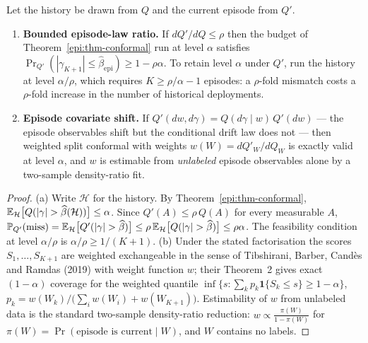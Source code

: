 \begin{theorem}\label{epi:thm-shift}
Let the history be drawn from $Q$ and the current episode from $Q'$.
\begin{enumerate}
\item[\textnormal{(a)}] \textbf{Bounded episode-law ratio.} If $dQ'/dQ\le\rho$ then the budget of
Theorem~\ref{epi:thm-conformal} run at level $\alpha$ satisfies
$\Pr_{Q'}(|\gamma_{K+1}|\le\widehat\beta_{\mathrm{epi}})\ge1-\rho\alpha$. To retain level $\alpha$
under $Q'$, run the history at level $\alpha/\rho$, which requires $K\ge\rho/\alpha-1$ episodes: a
$\rho$-fold mismatch costs a $\rho$-fold increase in the number of historical deployments.
\item[\textnormal{(b)}] \textbf{Episode covariate shift.} If $Q'(dw,d\gamma)=Q(d\gamma\mid w)\,Q'(dw)$
--- the episode observables shift but the conditional drift law does not --- then weighted split
conformal with weights $w(W)=dQ'_W/dQ_W$ is exactly valid at level $\alpha$, and $w$ is estimable
from \emph{unlabeled} episode observables alone by a two-sample density-ratio fit.
\end{enumerate}
\end{theorem}

\begin{proof}
(a) Write $\mathcal H$ for the history. By Theorem~\ref{epi:thm-conformal},
$\E_{\mathcal H}\bigl[Q(|\gamma|>\widehat\beta(\mathcal H))\bigr]\le\alpha$. Since
$Q'(A)\le\rho\,Q(A)$ for every measurable $A$,
$\Pr_{Q'}(\text{miss})=\E_{\mathcal H}\bigl[Q'(|\gamma|>\widehat\beta)\bigr]
\le\rho\,\E_{\mathcal H}\bigl[Q(|\gamma|>\widehat\beta)\bigr]\le\rho\alpha$. The feasibility
condition at level $\alpha/\rho$ is $\alpha/\rho\ge1/(K+1)$.
(b) Under the stated factorisation the scores $S_1,\dots,S_{K+1}$ are weighted exchangeable in the
sense of Tibshirani, Barber, Cand\`es and Ramdas (2019) with weight function
$w$; their Theorem~2 gives exact $(1-\alpha)$ coverage for the weighted quantile
$\inf\{s:\sum_k p_k\mathbf 1\{S_k\le s\}\ge1-\alpha\}$,
$p_k=w(W_k)/\bigl(\sum_i w(W_i)+w(W_{K+1})\bigr)$. Estimability of $w$ from unlabeled data is the
standard two-sample density-ratio reduction: $w\propto\frac{\pi(W)}{1-\pi(W)}$ for
$\pi(W)=\Pr(\text{episode is current}\mid W)$, and $W$ contains no labels.
\end{proof}

